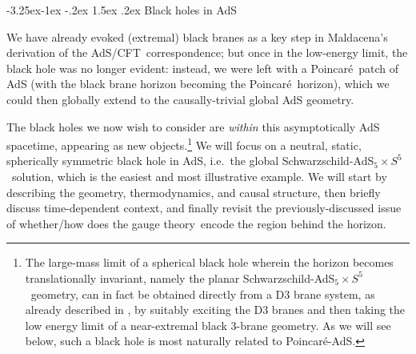 \documentclass[12pt]{article}
\makeatletter
\renewcommand\subsection{\@startsection{subsection}{2}{\z@}%
                                     {-3.25ex\@plus -1ex \@minus -.2ex}%
                                     {1.5ex \@plus .2ex}%
                                     {\normalfont\bfseries}}
\def\AC{AdS/CFT}
\def\GT{gauge theory}
\def\Poinc{Poincar\' e}
\def\schw{Schwarzschild}
\def\adss#1#2{AdS$_{#1} \times S^{#2}$}
\makeatother
\begin{document}
\subsection{Black holes in AdS}
\label{s:BHs}

We have already evoked (extremal) black branes as a key step in Maldacena's derivation \cite{Maldacena:1997re} of the \AC\ correspondence; but once in the low-energy limit, the black hole was no longer evident:  instead, we were left with a \Poinc\ patch of AdS (with the black brane horizon becoming the \Poinc\ horizon), which we could then globally extend to the causally-trivial global AdS geometry.

The black holes we now wish to consider are {\it within} this asymptotically AdS spacetime, appearing as new objects.\footnote{
The large-mass limit of a spherical black hole wherein the horizon becomes translationally invariant, namely the planar \schw-\adss55\  geometry, can in fact be obtained directly from a D3 brane system, as already described in \cite{Maldacena:1997re}, by suitably exciting the D3 branes and then taking the low energy limit of a near-extremal black 3-brane geometry.  As we will see below, such a black hole is most naturally related to \Poinc-AdS.
}
  We will focus on a neutral, static, spherically symmetric black hole in AdS, i.e.\ the global \schw-\adss55\  solution, which is the easiest and most illustrative example.   
We will start by describing the geometry, thermodynamics, and causal structure, then briefly discuss time-dependent context, and finally revisit the previously-discussed issue of whether/how does the \GT\ encode the region behind the horizon.
\end{document}
